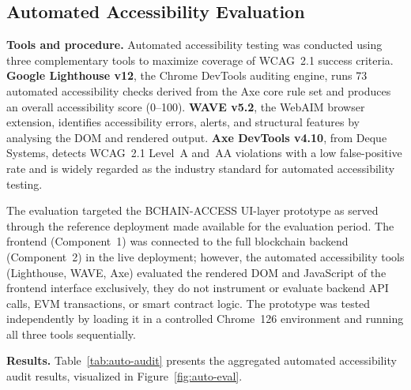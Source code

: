 \documentclass[journal,onecolumn]{IEEEtran}
\begin{document}
\subsection{Automated Accessibility Evaluation}
\label{subsec:auto-evaluation}

\noindent\textbf{Tools and procedure.} 
Automated accessibility testing was conducted using three complementary
tools to maximize coverage of WCAG~2.1 success criteria. \textbf{Google Lighthouse v12}, the Chrome DevTools auditing engine, runs 73 automated accessibility checks derived from the Axe core rule set and produces an overall accessibility score (0--100). \textbf{WAVE v5.2}, the WebAIM browser extension, identifies accessibility errors, alerts, and structural features by analysing the DOM and rendered output. \textbf{Axe DevTools v4.10}, from Deque Systems, detects WCAG~2.1 Level~A and~AA violations with a low false-positive rate and is widely regarded as the industry standard for automated accessibility testing.

The evaluation targeted the BCHAIN-ACCESS UI-layer prototype as served through the reference deployment made available for the evaluation period. The frontend (Component~1) was connected to the full blockchain backend (Component~2) in the live deployment; however, the automated accessibility tools (Lighthouse, WAVE, Axe) evaluated the rendered DOM and JavaScript of the frontend interface exclusively, they do not instrument or evaluate backend API calls, EVM transactions, or smart contract logic. The prototype was tested independently by loading it in a controlled Chrome~126 environment and running all three tools sequentially.

\noindent\textbf{Results.} 
Table~\ref{tab:auto-audit} presents the aggregated automated accessibility
audit results, visualized in Figure~\ref{fig:auto-eval}.
\end{document}

